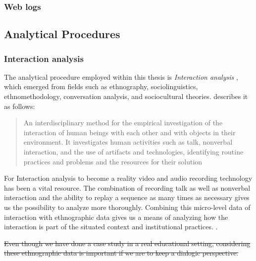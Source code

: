 \subsubsection{Web logs}





\subsection{Analytical Procedures}
\subsubsection{Interaction analysis}
The analytical procedure employed within this thesis is \emph{Interaction analysis} \citep{jordan1995interaction}, which emerged from fields such as ethnography, sociolinguistics, ethnomethodology, conversation analysis, and sociocultural theories. \citeauthor{jordan1995interaction} describes it as follows:

\begin{quote}
An interdisciplinary method for the empirical investigation of the interaction of human
beings with each other and with objects in their environment. It investigates human
activities such as talk, nonverbal interaction, and the use of artifacts and technologies,
identifying routine practices and problems and the resources for their solution \citep[p39]{jordan1995interaction}
\end{quote}

For Interaction analysis to become a reality video and audio recording technology has been a vital resource. The combination of recording talk as well as nonverbal interaction and the ability to replay a sequence as many times as necessary gives us the possibility to analyze more thoroughly. Combining this micro-level data of interaction with ethnographic data gives us a means of analyzing how the interaction is part of the situated context and institutional practices. \citep{furberg2009scientific}. 

\sout{Even though we have done a case study in a real educational setting, considering these ethnographic data is important if we are to keep a dialogic perspective.}


